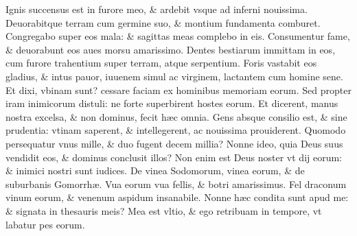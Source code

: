\documentclass[a5paper,10pt]{book}
\def\ae{æ}
\begin{document}
\begin{multicols*}{2}
\newline \color{red} I\color{black}gnis succensus est in furore meo, \& ardebit vsque ad inferni nouissima.
\newline \color{red} D\color{black}euorabitque terram cum germine suo, \& montium fundamenta comburet.
\newline \color{red} C\color{black}ongregabo super eos mala: \& sagittas meas complebo in eis.
\newline \color{red} C\color{black}onsumentur fame, \& deuorabunt eos aues morsu amarissimo.
\newline \color{red} D\color{black}entes bestiarum immittam in eos, cum furore trahentium super terram, atque serpentium.
\newline \color{red} F\color{black}oris vastabit eos gladius, \& intus pauor, iuuenem simul ac virginem, lactantem cum homine sene.
\newline \color{red} E\color{black}t dixi, vbinam sunt? cessare faciam ex hominibus memoriam eorum.%
\newline \color{red} S\color{black}ed propter iram inimicorum distuli: ne forte superbirent hostes eorum.
\newline \color{red} E\color{black}t dicerent, manus nostra excelsa, \& non dominus, fecit h\ae c omnia.
\newline \color{red} G\color{black}ens absque consilio est, \& sine prudentia: vtinam saperent, \& intellegerent, ac nouissima prouiderent.
\newline \color{red} Q\color{black}uomodo persequatur vnus mille, \& duo fugent decem millia?
\newline \color{red} N\color{black}onne ideo, quia Deus suus vendidit eos, \& dominus conclusit illos?
\newline \color{red} N\color{black}on enim est Deus noster vt dij eorum: \& inimici nostri sunt iudices.
\newline \color{red} D\color{black}e vinea Sodomorum, vinea eorum, \& de suburbanis Gomorrh\ae .
\newline \color{red} V\color{black}ua eorum vua fellis, \& botri amarissimus.%
\newline \color{red} F\color{black}el draconum vinum eorum, \& venenum aspidum insanabile.
\newline \color{red} N\color{black}onne h\ae c condita sunt apud me: \& signata in thesauris meis?
\newline \color{red} M\color{black}ea est vltio, \& ego retribuam in tempore, vt labatur pes eorum.

\end{multicols*}
\end{document}
